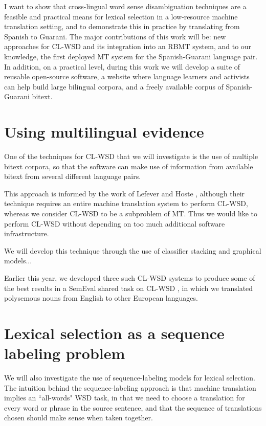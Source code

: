 \documentclass{article}
\begin{document}
I want to show that cross-lingual word sense disambiguation techniques are a
feasible and practical means for lexical selection in a low-resource machine
translation setting, and to demonstrate this in practice by translating from
Spanish to Guarani. The major contributions of this work will be: new
approaches for CL-WSD and its integration into an RBMT system, and to our
knowledge, the first deployed MT system for the Spanish-Guarani language pair.
In addition, on a practical level, during this work we will develop a suite of
reusable open-source software, a website where language learners and activists
can help build large bilingual corpora, and a freely available corpus of
Spanish-Guarani bitext.

\section{Using multilingual evidence}
One of the techniques for CL-WSD that we will investigate is the use of
multiple bitext corpora, so that the software can make use of information from
available bitext from several different language pairs.

This approach is informed by the work of Lefever and Hoste
\cite{lefever-hoste-decock:2011:ACL-HLT2011}, although their technique requires
an entire machine translation system to perform CL-WSD, whereas we consider
CL-WSD to be a subproblem of MT. Thus we would like to perform CL-WSD without
depending on too much additional software infrastructure.

We will develop this technique through the use of 
classifier stacking and graphical models...

Earlier this year, we developed three such CL-WSD systems
\cite{rudnick-liu-gasser:2013:SemEval-2013}
to produce some of the best results in a SemEval shared task
on CL-WSD \cite{task10}, in which we translated polysemous nouns from English
to other European languages.

\section{Lexical selection as a sequence labeling problem}
We will also investigate the use of 
sequence-labeling models for
lexical selection.
The intuition behind
the sequence-labeling approach is that machine translation implies an
``all-words" WSD task, in that we need to choose a translation for every word
or phrase in the source sentence, and that the sequence of translations chosen
should make sense when taken together.
\end{document}
